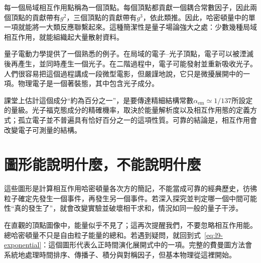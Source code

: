 每一個局域相互作用點稱為一個頂點。每個頂點都貢獻一個耦合常數因子，因此兩個頂點的貢獻帶有\(g^2\)，三個頂點的貢獻帶有\(g^3\)，依此類推。因此，哈密頓量中的單一項就能將一大類反應聯繫起來。這種簡潔性是量子場論強大之處：少數幾種局域相互作用，就能組織起大量散射資料。

\begin{classroomqa}
\end{classroomqa}

量子電動力學提供了一個熟悉的例子。在局域的電子--光子頂點，電子可以被湮滅後再產生，並同時產生一個光子。在二階過程中，電子可能發射並重新吸收光子。人們很容易把這個過程講成一段微型電影，但嚴謹地說，它只是微擾展開中的一項。物理電子是一個著裝態，其中包含光子成分。

課堂上估計這個成分``約為百分之一''，是要傳達精細結構常數\(\alpha_{\mathrm{em}}\simeq 1/137\)所設定的量級。光子福克態成分的精確機率，取決於能量解析度以及相互作用態的定義方式；孤立電子並不普遍具有恰好百分之一的這項性質。可靠的結論是，相互作用會改變電子可測量的結構。

\section{圖形能說明什麼，不能說明什麼}

這些圖形是計算相互作用哈密頓量各次方的簡記，不能當成可靠的經典歷史，彷彿粒子確定先發生一個事件，再發生另一個事件。若深入探究並判定哪一個中間可能性``真的發生了''，就會改變實驗並破壞相干求和，情況如同一般的量子干涉。

\begin{classroomqa}
\end{classroomqa}

在直觀的頂點圖像中，能量似乎不見了；這再次提醒我們，不要忽略相互作用能。總哈密頓量不只是自由粒子能量的總和。若遇到疑問，就回到式~\eqref{eq:l9-exponential}：這個圖形代表么正時間演化展開式中的一項。完整的費曼圖方法會系統地處理時間排序、傳播子、積分與對稱因子，但基本物理從這裡開始。

